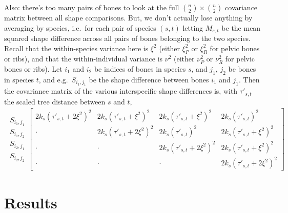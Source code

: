 \documentclass{article}
\begin{document}
Also: there's too many pairs of bones to look at the full ${n \choose 2} \times {n \choose 2}$ covariance matrix
between all shape comparisons.
But, we don't actually lose anything by averaging by species, 
i.e.\ for each pair of species $(s,t)$ letting $M_{s,t}$ be the mean squared shape difference across all pairs of bones belonging to the two species.
Recall that the within-species variance here is $\xi^2$ (either $\xi^2_P$ or $\xi^2_R$ for pelvic bones or ribs),
and that the within-individual variance is $\nu^2$ (either $\nu^2_P$ or $\nu^2_R$ for pelvic bones or ribs).
Let $i_1$ and $i_2$ be indices of bones in species $s$, and $j_1$, $j_2$ be bones in species $t$,
and e.g.\ $S_{i_1,j_1}$ be the shape difference between bones $i_1$ and $j_1$.
Then the covariance matrix of the various interspecific shape differences is, with $\tau'_{s,t}$ the scaled tree distance between $s$ and $t$,
\begin{align}
\begin{matrix}
S_{i_1,j_1} \\
S_{i_1,j_2} \\
S_{i_2,j_1} \\
S_{i_2,j_2} 
\end{matrix}
\begin{bmatrix}
  2 k_s ( \tau'_{s,t} + 2 \xi^2 )^2   &  
    2 k_s ( \tau'_{s,t} + \xi^2 )^2   &  
    2 k_s ( \tau'_{s,t} + \xi^2 )^2   &  
    2 k_s ( \tau'_{s,t} )^2   \\
  \cdot & 
    2 k_s ( \tau'_{s,t} + 2 \xi^2 )^2   &  
    2 k_s ( \tau'_{s,t} )^2   &  
    2 k_s ( \tau'_{s,t} + \xi^2 )^2   \\
  \cdot & 
    \cdot & 
    2 k_s ( \tau'_{s,t} + 2 \xi^2 )^2   &  
    2 k_s ( \tau'_{s,t} + \xi^2 )^2   \\
  \cdot & 
    \cdot & 
    \cdot & 
    2 k_s ( \tau'_{s,t} + 2 \xi^2 )^2   
\end{bmatrix}
\end{align}



\section{Results}
\end{document}
